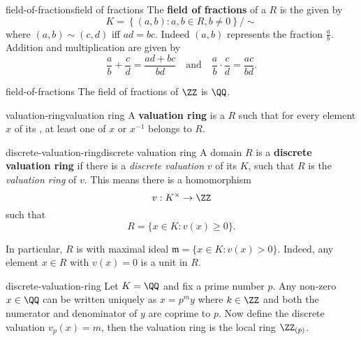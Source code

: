 \begin{topic}{field-of-fractions}{field of fractions}
    The \textbf{field of fractions} of a  $R$ is the  given by
    \[ K = \left\{ (a, b) : a, b \in R, b \ne 0 \right\} / \sim{} \]
    where $(a, b) \sim{} (c, d)$ iff $ad = bc$. Indeed $(a, b)$ represents the fraction $\frac{a}{b}$. Addition and multiplication are given by
    \[ \frac{a}{b} + \frac{c}{d} = \frac{ad + bc}{bd} \quad \text{and} \quad \frac{a}{b} \cdot \frac{c}{d} = \frac{ac}{bd} . \]
\end{topic}

\begin{example}{field-of-fractions}
    The field of fractions of $\ZZ$ is $\QQ$.
\end{example}

\begin{topic}{valuation-ring}{valuation ring}
    A \textbf{valuation ring} is a  $R$ such that for every element $x$ of its , at least one of $x$ or $x^{-1}$ belongs to $R$.
\end{topic}

\begin{topic}{discrete-valuation-ring}{discrete valuation ring}
    A domain  $R$ is a \textbf{discrete valuation ring} if there is a \textit{discrete valuation} $v$ of its  $K$, such that $R$ is the \textit{valuation ring} of $v$. This means there is a homomorphism
    \[ v : K^\times \to \ZZ \]
    such that
    \[ R = \{ x \in K : v(x) \ge 0 \} . \]
    
    In particular, $R$ is  with maximal ideal $\mathfrak{m} = \{ x \in K : v(x) > 0 \}$. Indeed, any element $x \in R$ with $v(x) = 0$ is a unit in $R$.
\end{topic}

\begin{example}{discrete-valuation-ring}
    Let $K = \QQ$ and fix a prime number $p$. Any non-zero $x \in \QQ$ can be written uniquely as $x = p^m y$ where $k \in \ZZ$ and both the numerator and denominator of $y$ are coprime to $p$. Now define the discrete valuation $v_p(x) = m$, then the valuation ring is the local ring $\ZZ_{(p)}$.
\end{example}


